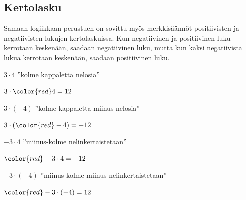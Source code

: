 \subsection*{Kertolasku}

    Samaan logiikkaan perustuen on sovittu myös merkkisäännöt positiivisten ja negatiivisten lukujen kertolaskuissa. Kun negatiivinen ja positiivinen luku kerrotaan keskenään, saadaan negatiivinen luku, mutta kun kaksi negatiivista lukua kerrotaan keskenään, saadaan positiivinen luku.

    $3 \cdot 4$ ''kolme kappaletta nelosia''
    
   \begin{center}
    \begin{lukusuora}{-1}{14}{14}
	\color{red} 
	\color{red} 
	\color{red} 

      \end{lukusuora}
      $3\cdot {\color{red}4}=12$
    \end{center}
    
    $3 \cdot (-4)$ ''kolme kappaletta miinus-nelosia''
    
    
    \begin{center}
    \begin{lukusuora}{-13}{2}{14}
	\color{red} 
	\color{red} 
	\color{red} 

      \end{lukusuora}
      $3\cdot ({\color{red}-4})=-12$
    \end{center}
    
    $-3 \cdot 4$ ''miinus-kolme nelinkertaistetaan''
    
    \begin{center}
    \begin{lukusuora}{-13}{2}{14}
	\color{red} 
	\color{red} 
	\color{red} 
	\color{red} 

      \end{lukusuora}
      ${\color{red}-3}\cdot 4=-12$
    \end{center}
    
    $-3 \cdot (-4)$ ''miinus-kolme miinus-nelinkertaistetaan''
    
    \begin{center}
    \begin{lukusuora}{-1}{14}{14}
	\color{red} 
	\color{red} 
	\color{red} 
	\color{red} 

      \end{lukusuora}
      ${\color{red}-3}\cdot (-4)=12$
    \end{center}

